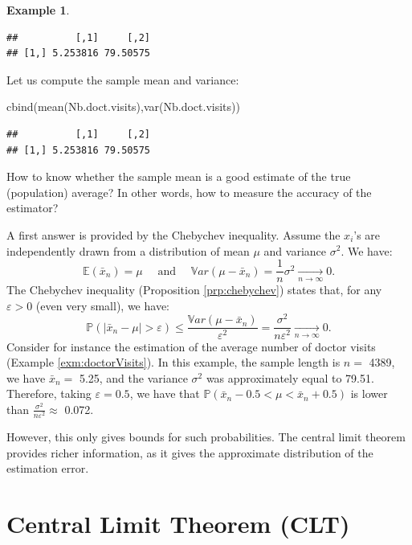 \documentclass[
  12pt,
]{book}
\newenvironment{Shaded}{\begin{snugshade}}{\end{snugshade}}
\newcommand{\FunctionTok}[1]{\textcolor[rgb]{0.00,0.00,0.00}{#1}}
\newcommand{\NormalTok}[1]{#1}
\theoremstyle{definition}
\theoremstyle{definition}
\newtheorem{example}{Example}[chapter]
\theoremstyle{definition}
\theoremstyle{definition}
\theoremstyle{remark}
\begin{document}
\begin{example}
\begin{verbatim}
##          [,1]     [,2]
## [1,] 5.253816 79.50575
\end{verbatim}

Let us compute the sample mean and variance:

\begin{Shaded}
\begin{Highlighting}[]
\FunctionTok{cbind}\NormalTok{(}\FunctionTok{mean}\NormalTok{(Nb.doct.visits),}\FunctionTok{var}\NormalTok{(Nb.doct.visits))}
\end{Highlighting}
\end{Shaded}

\begin{verbatim}
##          [,1]     [,2]
## [1,] 5.253816 79.50575
\end{verbatim}

\end{example}

How to know whether the sample mean is a good estimate of the true (population) average? In other words, how to measure the accuracy of the estimator?

A first answer is provided by the Chebychev inequality. Assume the \(x_i\)'s are independently drawn from a distribution of mean \(\mu\) and variance \(\sigma^2\). We have:
\[
\mathbb{E}(\bar{x}_n) = \mu \quad \mbox{ and } \quad \mathbb{V}ar(\mu - \bar{x}_n) = \frac{1}{n}\sigma^2 \underset{n \rightarrow \infty}{\rightarrow} 0.
\]
The Chebychev inequality (Proposition \ref{prp:chebychev}) states that, for any \(\varepsilon > 0\) (even very small), we have:
\[
\mathbb{P}(|\bar{x}_n-\mu|>\varepsilon) \le \frac{\mathbb{V}ar(\mu - \bar{x}_n)}{\varepsilon^2} = \frac{\sigma^2}{n\varepsilon^2} \underset{n \rightarrow \infty}{\rightarrow} 0.
\]
Consider for instance the estimation of the average number of doctor visits (Example \ref{exm:doctorVisits}). In this example, the sample length is \(n=\) 4389, we have \(\bar{x}_n=\) 5.25, and the variance \(\sigma^2\) was approximately equal to 79.51. Therefore, taking \(\varepsilon=0.5\), we have that \(\mathbb{P}(\bar{x}_n-0.5<\mu<\bar{x}_n+0.5)\) is lower than \(\frac{\sigma^2}{n\varepsilon^2} \approx\)
0.072.

However, this only gives bounds for such probabilities. The central limit theorem provides richer information, as it gives the approximate distribution of the estimation error.

\hypertarget{central-limit-theorem-clt}{%
\section{Central Limit Theorem (CLT)}\label{central-limit-theorem-clt}}
\end{document}
